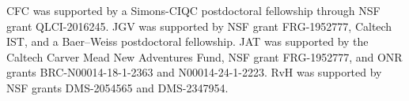 \documentclass[10pt,reqno]{amsart}
\theoremstyle{definition}
\theoremstyle{remark}
\numberwithin{equation}{section}
\numberwithin{figure}{section}
\numberwithin{table}{section}
\begin{document}
CFC was supported by a Simons-CIQC postdoctoral fellowship through NSF 
grant QLCI-2016245. JGV was supported by NSF grant FRG-1952777, Caltech 
IST, and a Baer--Weiss postdoctoral fellowship. JAT was supported by the 
Caltech Carver Mead New Adventures Fund, NSF grant FRG-1952777, and ONR 
grants BRC-N00014-18-1-2363 and N00014-24-1-2223. RvH was supported by NSF 
grants DMS-2054565 and DMS-2347954.





\end{document}
